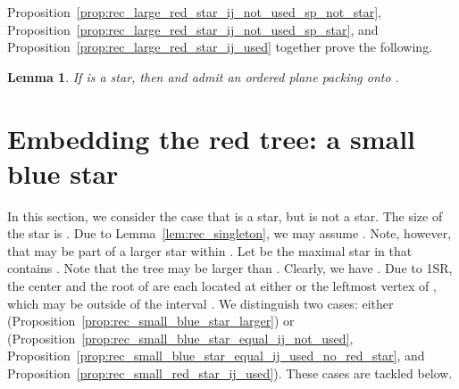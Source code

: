 \documentclass[11pt,a4paper,colorlinks=true,urlcolor=blue,citecolor=red]{article}
\theoremstyle{plain}
\newtheorem{lemma}[theorem]{Lemma}
\begin{document}
Proposition~\ref{prop:rec_large_red_star_ij_not_used_sp_not_star},
Proposition~\ref{prop:rec_large_red_star_ij_not_used_sp_star}, and
Proposition~\ref{prop:rec_large_red_star_ij_used} together prove the
following.

\begin{lemma}
  \label{lem:rec_large_red_star}
  If  is a star, then  and  admit an ordered plane packing
  onto .
\end{lemma}

\section{Embedding the red tree: a small blue star}
\label{subsec:rec_small_blue_star}
In this section, we consider the case that  is a star, but
 is not a star. The size of the star is . Due to
Lemma~\ref{lem:rec_singleton}, we may assume . Note, however,
that  may be part of a larger star within . Let
 be the maximal star in  that contains . Note
that the tree  may be larger than . Clearly, we have
. Due to 1SR, the center and the root
of  are each located at either  or the leftmost vertex of
, which may be outside of the interval . We
distinguish two cases: either 
(Proposition~\ref{prop:rec_small_blue_star_larger}) or 
(Proposition~\ref{prop:rec_small_blue_star_equal_ij_not_used},
Proposition~\ref{prop:rec_small_blue_star_equal_ij_used_no_red_star},
and Proposition~\ref{prop:rec_small_red_star_ij_used}). These cases are
tackled below.
\end{document}
